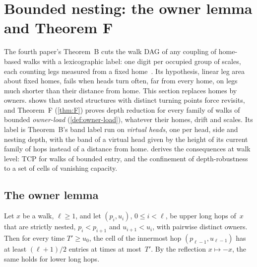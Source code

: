 \section{Bounded nesting: the owner lemma and Theorem F}\label{sec:nesting}

The fourth paper's Theorem~B cuts the walk DAG of any coupling of home-based walks with a lexicographic label: one
digit per occupied group of scales, each counting legs measured from a fixed home~\cite[Theorem~4.20]{FourthPaper2026}.
Its hypothesis, linear leg area about fixed homes, fails when heads turn often, far from every home, on legs much shorter
than their distance from home. This section
replaces homes by owners.  shows that nested structures with distinct turning points force revisits, and
Theorem~F (\cref{thm:F}) proves depth reduction for every family of walks of bounded \emph{owner-load}
(\cref{def:owner-load}), whatever their homes, drift and scales. Its label is Theorem~B's band label run on \emph{virtual
heads}, one per head, side and nesting depth, with the band of a virtual head given by the height of its current family of
hops instead of a distance from home.  derives the consequences at walk level: TCP for walks of
bounded entry, and the confinement of depth-robustness to a set of cells of vanishing capacity.

\subsection{The owner lemma}\label{sec:nest-owner}

\begin{lemma}\label{lem:owner}
Let $x$ be a walk, $\ell\ge1$, and let $(p_i,u_i)$, $0\le i<\ell$, be upper long hops of~$x$ that are strictly nested,
$p_i<p_{i+1}$ and $u_{i+1}<u_i$, with pairwise distinct owners. Then for every time $T'\ge u_0$, the cell of the innermost
hop $(p_{\ell-1},u_{\ell-1})$ has at least $(\ell+1)/2$ entries at times at most~$T'$. By the reflection $x\mapsto-x$, the
same holds for lower long hops.
\end{lemma}

